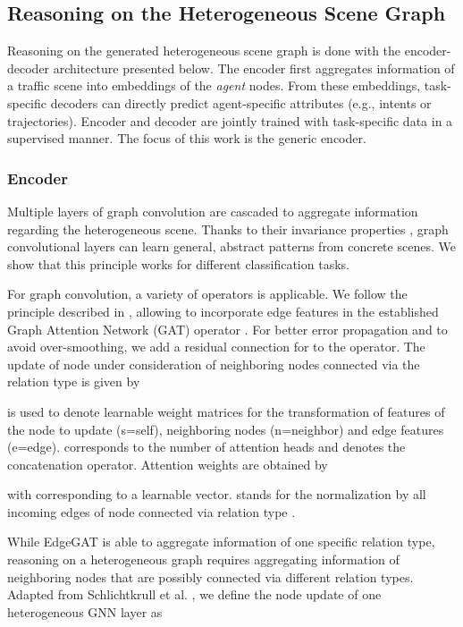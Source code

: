 \documentclass[letterpaper, 10 pt, journal, twoside]{IEEEtran}
\begin{document}
 
\subsection{Reasoning on the Heterogeneous Scene Graph}
Reasoning on the generated heterogeneous scene graph is done with the encoder-decoder architecture presented below.
The encoder first aggregates information of a traffic scene into embeddings of the \textit{agent} nodes.
From these embeddings, task-specific decoders can directly predict agent-specific attributes (e.g., intents or trajectories).
Encoder and decoder are jointly trained with task-specific data in a supervised manner.
The focus of this work is the generic encoder.

\subsubsection{Encoder}
Multiple layers of graph convolution are cascaded to aggregate information regarding the heterogeneous scene.
Thanks to their invariance properties \cite{Keriven2019}, graph convolutional layers can learn general, abstract patterns from concrete scenes.
We show that this principle works for different classification tasks.

For graph convolution, a variety of operators is applicable.
We follow the principle described in \cite{Wang2021}, allowing to incorporate edge features in the established Graph Attention Network (GAT) operator \cite{Velickovic2018}.
For better error propagation and to avoid over-smoothing, we add a residual connection for  to the operator.
The update of node  under consideration of neighboring nodes connected via the relation type  is given by

 is used to denote learnable weight matrices for the transformation of features of the node to update (s=self), neighboring nodes (n=neighbor) and edge features (e=edge).
 corresponds to the number of attention heads and  denotes the concatenation operator.
Attention weights are obtained by

with  corresponding to a learnable vector.
 stands for the normalization by all incoming edges of node  connected via relation type .

While EdgeGAT is able to aggregate information of one specific relation type, reasoning on a heterogeneous graph requires aggregating information of neighboring nodes that are possibly connected via different relation types.
Adapted from Schlichtkrull et al. \cite{Schlichtkrull2018}, we define the node update of one heterogeneous GNN layer as
\end{document}
